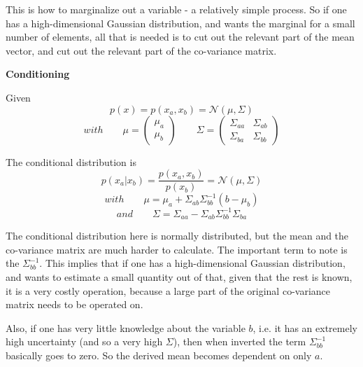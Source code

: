 \documentclass[a4paper]{article}
\begin{document}
This is how to marginalize out a variable - a relatively simple process. So if one has a high-dimensional Gaussian distribution, and wants the marginal for a small number of elements, all that is needed is to cut out the relevant part of the mean vector, and cut out the relevant part of the co-variance matrix.

\textbf{Conditioning}

Given 
\begin{equation*}
    p(x) = p(x_a, x_b) = \mathcal{N}(\mu, \Sigma)
\end{equation*}
\begin{equation*}
    with 
    \qquad
    \mu =
    \begin{pmatrix}
         \mu_a \\ \mu_b
    \end{pmatrix}
    \qquad
    \Sigma = 
    \begin{pmatrix}
         \Sigma_{aa} & \Sigma_{ab} 
         \\ \Sigma_{ba} & \Sigma_{bb}
    \end{pmatrix}
\end{equation*}

The conditional distribution is
\begin{equation*}
    p(x_a | x_b) = \frac{p(x_a, x_b)} {p(x_b)} = \mathcal{N} (\mu, \Sigma)
\end{equation*}
\begin{equation*}
    with
    \qquad
    \mu = \mu_a + \Sigma_{ab} \Sigma_{bb}^{-1} (b - \mu_b)
\end{equation*}
\begin{equation*}
    and
    \qquad
    \Sigma = \Sigma_{aa} - \Sigma_{ab} \Sigma_{bb}^{-1} \Sigma_{ba}
\end{equation*}

The conditional distribution here is normally distributed, but the mean and the co-variance matrix are much harder to calculate. 
The important term to note is the $\Sigma_{bb}^{-1}$. This implies that if one has a high-dimensional Gaussian distribution, and wants to estimate a small quantity out of that, given that the rest is known, it is a very costly operation, because a large part of the original co-variance matrix needs to be operated on.

Also, if one has very little knowledge about the variable $b$, i.e. it has an extremely high uncertainty (and so a very high $\Sigma$), then when inverted the term $\Sigma_{bb}^{-1}$ basically goes to zero. So the derived mean becomes dependent on only $a$.
\end{document}
